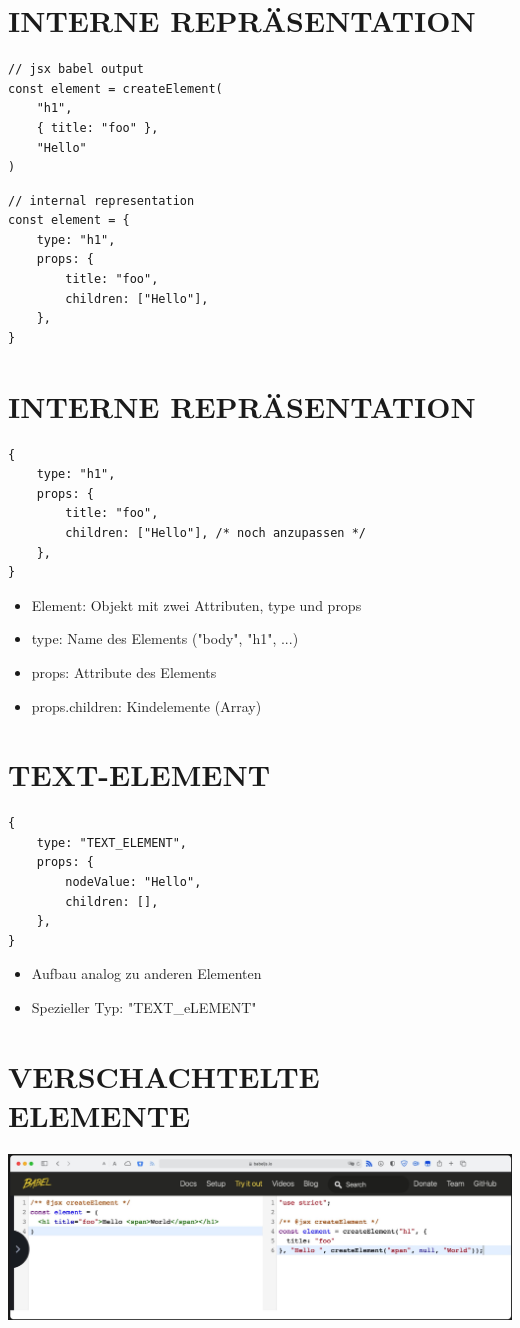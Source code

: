 \documentclass[10pt]{article}
\begin{document}
\section*{INTERNE REPRÄSENTATION}
\begin{verbatim}
// jsx babel output
const element = createElement(
    "h1",
    { title: "foo" },
    "Hello"
)
\end{verbatim}

\begin{verbatim}
// internal representation
const element = {
    type: "h1",
    props: {
        title: "foo",
        children: ["Hello"],
    },
}
\end{verbatim}

\section*{INTERNE REPRÄSENTATION}
\begin{verbatim}
{
    type: "h1",
    props: {
        title: "foo",
        children: ["Hello"], /* noch anzupassen */
    },
}
\end{verbatim}

\begin{itemize}
  \item Element: Objekt mit zwei Attributen, type und props
  \item type: Name des Elements ("body", "h1", ...)
  \item props: Attribute des Elements
  \item props.children: Kindelemente (Array)
\end{itemize}

\section*{TEXT-ELEMENT}
\begin{verbatim}
{
    type: "TEXT_ELEMENT",
    props: {
        nodeValue: "Hello",
        children: [],
    },
}
\end{verbatim}

\begin{itemize}
  \item Aufbau analog zu anderen Elementen
  \item Spezieller Typ: "TEXT\_eLEMENT"
\end{itemize}

\section*{VERSCHACHTELTE ELEMENTE}
\begin{center}
\includegraphics[max width=\textwidth]{2025_01_02_254b5e4c52d090c313e1g-11}
\end{center}
\end{document}
